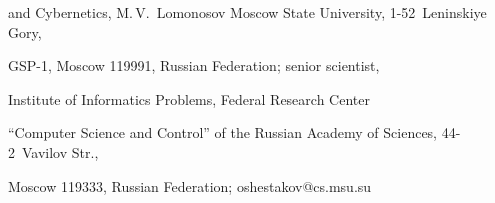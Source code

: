 and Cybernetics, M.\,V.~Lomonosov Moscow State University, 1-52~Leninskiye Gory,

 GSP-1, Moscow 119991, Russian Federation; senior scientist, 

 Institute of Informatics Problems, Federal Research Center 

 ``Computer Science and Control'' of the Russian Academy of Sciences, 44-2~Vavilov Str., 

 Moscow 119333, Russian Federation; \mbox{oshestakov@cs.msu.su}

\label{end\stat}





\renewcommand{\bibname}{\protect\rm Литература} 

